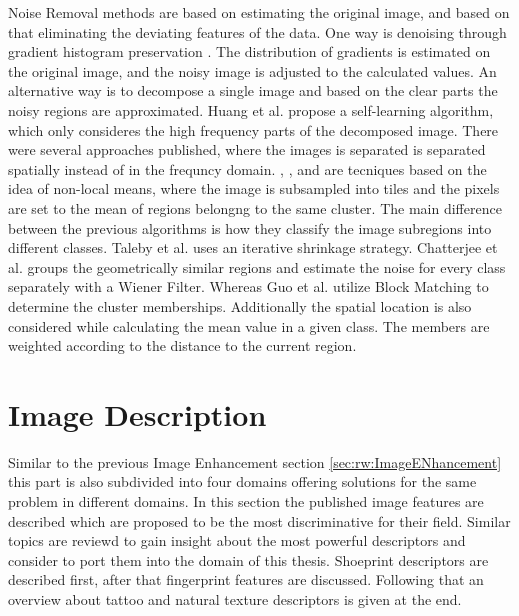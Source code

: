 \documentclass[draft,final]{vutinfth} %
\begin{document}
Noise Removal methods are based on estimating the original image, and based on that eliminating the deviating features of the data.
One way is denoising through gradient histogram preservation \cite{zuo2013texture}.
The distribution of gradients is estimated on the original image, and the noisy image is adjusted to the calculated values.
An alternative way is to decompose a single image and based on the clear parts the noisy regions are approximated.
Huang et al. \cite{huang2013self} propose a self-learning algorithm, which only consideres the high frequency parts of the decomposed image.
There were several approaches published, where the images is separated is separated spatially instead of in the frequncy domain.
\cite{xu2015patch}, \cite{talebi2013global}, \cite{chatterjee2011patch} and \cite{guo2015efficient} are tecniques based on the idea of non-local means, where the image is subsampled into tiles and the pixels are set to the mean of regions belongng to the same cluster.
The main difference between the previous algorithms is how they classify the image subregions into different classes.
Taleby et al. \cite{talebi2013global} uses an iterative shrinkage strategy. 
Chatterjee et al.  \cite{chatterjee2011patch} groups the geometrically similar regions and estimate the noise for every class separately with a Wiener Filter.
Whereas Guo et al. \cite{guo2015efficient} utilize Block Matching to determine the cluster memberships. 
Additionally the spatial location is also considered while calculating the mean value in a given class.
The members are weighted according to the distance to the current region.

\section{Image Description}

Similar to the previous Image Enhancement section \ref{sec:rw:ImageENhancement} this part is also subdivided into four domains offering solutions for the same problem in different domains.
In this section the published image features are described which are proposed to be the most discriminative for their field.
Similar topics are reviewd to gain insight about the most powerful descriptors and consider to port them into the domain of this thesis.
Shoeprint descriptors are described first, after that fingerprint features are discussed.
Following that an overview about tattoo and natural texture descriptors is given at the end.
\end{document}
